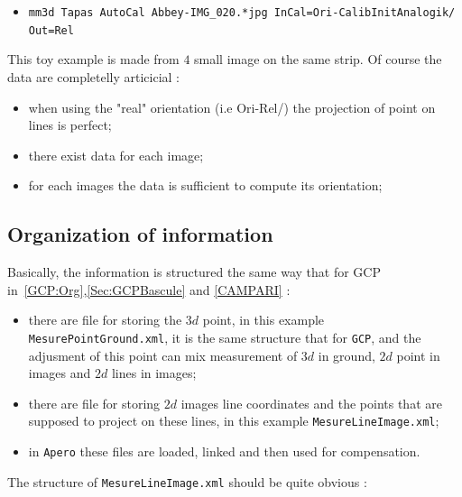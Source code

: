 \begin{itemize}
   \item {\tt mm3d Tapas AutoCal Abbey-IMG\_020.*jpg InCal=Ori-CalibInitAnalogik/ Out=Rel}

\end{itemize}

This toy example is made from $4$ small image on the same strip. Of course the data are completelly  articicial :

\begin{itemize}
   \item when using the "real" orientation (i.e Ori-Rel/) the projection of point on lines is perfect;
   \item there exist data for each image;
   \item for each images the data is sufficient to compute its orientation;
\end{itemize}


\subsection{Organization of information}

Basically, the information is structured  the same way that for GCP in~\ref{GCP:Org},\ref{Sec:GCPBascule} and 
\ref{CAMPARI} : 

\begin{itemize}
   \item there are file for storing the $3d$ point, in this example {\tt MesurePointGround.xml}, it is the same
         structure that for {\tt GCP}, and the adjusment of this point can mix measurement of $3d$ in ground,
         $2d$ point in images and $2d$ lines in images;

   \item there are file for storing $2d$  images line  coordinates and the points that are  supposed to project 
         on these  lines, in this example {\tt MesureLineImage.xml};

   \item in {\tt Apero} these files are loaded, linked  and then used for compensation.
\end{itemize}

The structure of {\tt MesureLineImage.xml} should be quite obvious :

